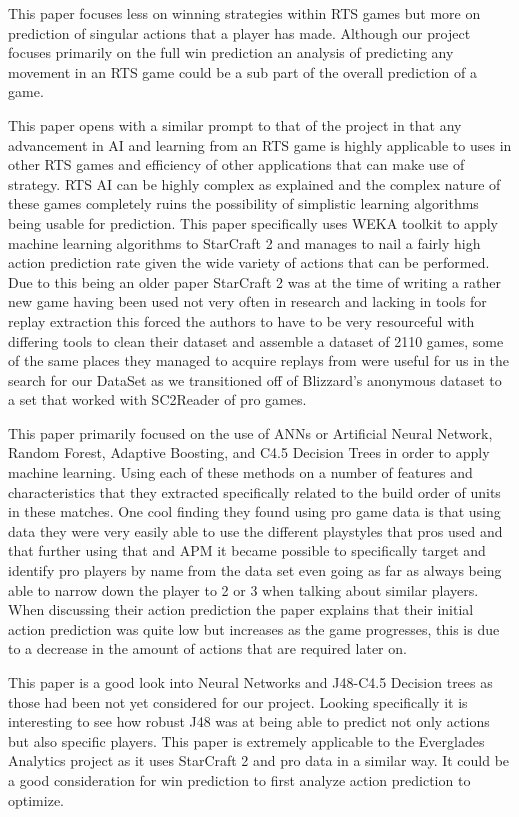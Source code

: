 \documentclass[a4paper,12pt]{report}
\begin{document}
This paper focuses less on winning strategies within RTS games but more on prediction of singular actions that a player has made. Although our project focuses primarily on the full win prediction an analysis of predicting any movement in an RTS game could be a sub part of the overall prediction of a game. 

This paper opens with a similar prompt to that of the project in that any advancement in AI and learning from an RTS game is highly applicable to uses in other RTS games and efficiency of other applications that can make use of strategy. RTS AI can be highly complex as explained and the complex nature of these games completely ruins the possibility of simplistic learning algorithms being usable for prediction. This paper specifically uses WEKA toolkit to apply machine learning algorithms to StarCraft 2 and manages to nail a fairly high action prediction rate given the wide variety of actions that can be performed. Due to this being an older paper StarCraft 2 was at the time of writing a rather new game having been used not very often in research and lacking in tools for replay extraction this forced the authors to have to be very resourceful with differing tools to clean their dataset and assemble a dataset of 2110 games, some of the same places they managed to acquire replays from were useful for us in the search for our DataSet as we transitioned off of Blizzard’s anonymous dataset to a set that worked with SC2Reader of pro games. 

This paper primarily focused on the use of ANNs or Artificial Neural Network, Random Forest, Adaptive Boosting, and C4.5 Decision Trees in order to apply machine learning. Using each of these methods on a number of features and characteristics that they extracted specifically related to the build order of units in these matches. One cool finding they found using pro game data is that using data they were very easily able to use the different playstyles that pros used and that further using that and APM it became possible to specifically target and identify pro players by name from the data set even going as far as always being able to narrow down the player to 2 or 3 when talking about similar players. When discussing their action prediction the paper explains that their initial action prediction was quite low but increases as the game progresses, this is due to a decrease in the amount of actions that are required later on.

This paper is a good look into Neural Networks and J48-C4.5 Decision trees as those had been not yet considered for our project. Looking specifically it is interesting to see how robust J48 was at being able to predict not only actions but also specific players. This paper is extremely applicable to the Everglades Analytics project as it uses StarCraft 2 and pro data in a similar way. It could be a good consideration for win prediction to first analyze action prediction to optimize.
\end{document}
